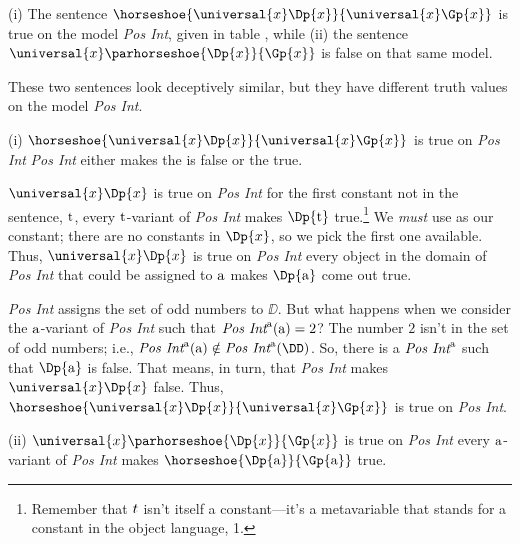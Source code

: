 \begin{majorILnc}{}
(i) The sentence $\horseshoe{\universal{\variable{x}}\Dp{\variable{x}}}{\universal{\variable{x}}\Gp{\variable{x}}}$ is true on the model \emph{Pos Int}, given in table , while (ii) the sentence $\universal{\variable{x}}\parhorseshoe{\Dp{\variable{x}}}{\Gp{\variable{x}}}$ is false on that same model.
\end{majorILnc}
\begin{PROOF}
These two sentences look deceptively similar, but they have different truth values on the model \emph{Pos Int}.  

(i) $\horseshoe{\universal{\variable{x}}\Dp{\variable{x}}}{\universal{\variable{x}}\Gp{\variable{x}}}$ is true on \emph{Pos Int} \Iff \emph{Pos Int} either makes the  is false or the  true.

$\universal{\variable{x}}\Dp{\variable{x}}$ is true on \emph{Pos Int} \Iff for the first constant not in the sentence, $\mathrm{t}$, every $\mathrm{t}$-variant of \emph{Pos Int} makes $\Dp{\constant{t}}$ true.\footnote{Remember that $t$ isn't itself a constant---it's a metavariable that stands for a constant in the object language, \GQL{}1.}  We \emph{must} use  as our constant; there are no constants in $\Dp{\variable{x}}$, so we pick the first one available. Thus, $\universal{\variable{x}}\Dp{\variable{x}}$ is true on \emph{Pos Int} \Iff every object in the domain of \emph{Pos Int} that could be assigned to $\mathrm{a}$ makes $\Dp{\constant{a}}$ come out true.

\emph{Pos Int} assigns the set of odd numbers to $\DD$.  But what happens when we consider the $\mathrm{a}$-variant of \emph{Pos Int} such that $\emph{Pos Int}^{\mathrm{a}}(\mathrm{a})=2$?  The number $2$ isn't in the set of odd numbers; i.e., $\emph{Pos Int}^{\constant{a}}(\constant{a})\notin\emph{Pos Int}^{\constant{a}}(\DD)$.  So, there is a $\emph{Pos Int}^{\mathrm{a}}$ such that $\Dp{\constant{a}}$ is false.  That means, in turn, that \emph{Pos Int} makes $\universal{\variable{x}}\Dp{\variable{x}}$ false.  Thus, $\horseshoe{\universal{\variable{x}}\Dp{\variable{x}}}{\universal{\variable{x}}\Gp{\variable{x}}}$ is true on \emph{Pos Int}.

(ii) $\universal{\variable{x}}\parhorseshoe{\Dp{\variable{x}}}{\Gp{\variable{x}}}$ is true on \emph{Pos Int} \Iff every $\mathrm{a}$-variant of \emph{Pos Int} makes $\horseshoe{\Dp{\constant{a}}}{\Gp{\constant{a}}}$ true.  


\end{PROOF}
